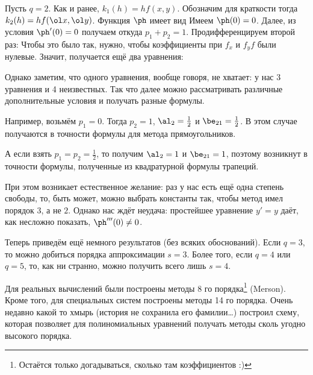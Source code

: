 \documentclass[a4paper]{article}
\begin{document}
\begin{ex}
Пусть $q = 2$. Как и ранее, $k_1(h) = hf(x,y)$.  Обозначим для
краткости 
тогда $k_2(h) =h f(\ol x, \ol y)$. Функция $\ph$ имеет вид   Имеем $\ph(0)
= 0$. Далее, из условия $\ph'(0) = 0$ получаем  откуда $p_1 + p_2 = 1$.  Продифференцируем второй
раз:  Чтобы это было так, нужно, чтобы коэффициенты при
$f_x$ и $f_yf$ были нулевые.  Значит, получается ещё два уравнения:

Однако заметим, что одного уравнения, вообще говоря, не хватает: у нас
3 уравнения и 4 неизвестных.  Так что далее можно рассматривать
различные дополнительные условия и получать разные формулы.

Например, возьмём $p_1 = 0$. Тогда $p_2 = 1$, $\al_2 = \frac12$ и
$\be_{21} = \frac12$.  В этом случае получаются в точности формулы для
метода прямоугольников.

А если взять $p_1 = p_2 = \frac12$, то получим $\al_2 = 1$ и $\be_{21}
= 1$, поэтому возникнут в точности формулы, полученные из квадратурной
формулы трапеций.

При этом возникает естественное желание: раз у нас есть ещё одна
степень свободы, то, быть может, можно выбрать константы так, чтобы
метод имел порядок $3$, а не $2$.  Однако нас ждёт неудача: простейшее
уравнение $y' = y$ даёт, как несложно показать, $\ph'''(0) \ne 0$.

Теперь приведём ещё немного результатов (без всяких обоснований).
Если $q = 3$, то можно добиться порядка аппроксимации $s = 3$.  Более
того, если $q = 4$ или $q = 5$, то, как ни странно, можно получить
всего лишь $s = 4$.

Для реальных вычислений были построены методы 8 го
порядка\footnote{Остаётся только догадываться, сколько там
  коэффициентов :)} (Merson).  Кроме того, для специальных систем
построены методы 14 го порядка. Очень недавно какой то хмырь (история
не сохранила его фамилии\ldots) построил схему, которая позволяет для
полиномиальных уравнений получать методы сколь угодно высокого
порядка.
\end{ex}
\end{document}
